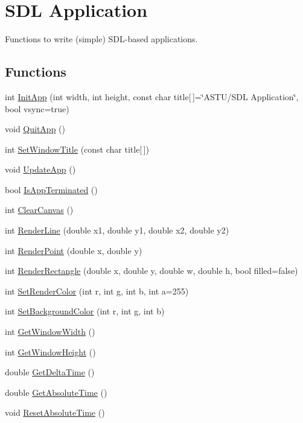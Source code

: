 \hypertarget{group__sdl__group}{}\section{S\+DL Application}
\label{group__sdl__group}


Functions to write (simple) S\+D\+L-\/based applications.  


\subsection*{Functions}
\begin{DoxyCompactItemize}
\item 
int \hyperlink{group__sdl__group_ga8f43e7993cf196bb0af33a60bc93aa75}{Init\+App} (int width, int height, const char title\mbox{[}$\,$\mbox{]}=\char`\"{}A\+S\+TU/S\+DL Application\char`\"{}, bool vsync=true)
\item 
void \hyperlink{group__sdl__group_gaf4cba1685a7c46bccc7bbdf863114cee}{Quit\+App} ()
\item 
int \hyperlink{group__sdl__group_ga6dfd8bbc85eeeee6922576be9ae65e29}{Set\+Window\+Title} (const char title\mbox{[}$\,$\mbox{]})
\item 
void \hyperlink{group__sdl__group_ga9bf9bfe01e7d336c3a3b13cc923ff850}{Update\+App} ()
\item 
bool \hyperlink{group__sdl__group_ga6d29aa641d22a0299da4710022c8c96b}{Is\+App\+Terminated} ()
\item 
int \hyperlink{group__sdl__group_ga4cc0ada571b47d2b809d441fa6766b52}{Clear\+Canvas} ()
\item 
int \hyperlink{group__sdl__group_gade420aec0a7492d5ac5f320b1ff4a814}{Render\+Line} (double x1, double y1, double x2, double y2)
\item 
int \hyperlink{group__sdl__group_gadd510400a2614b9b8fd8afbe368fc795}{Render\+Point} (double x, double y)
\item 
int \hyperlink{group__sdl__group_gaa5b815a9fcac2b1be46a5957bdbfd13f}{Render\+Rectangle} (double x, double y, double w, double h, bool filled=false)
\item 
int \hyperlink{group__sdl__group_gab01fa8f79d94269a5b9a1cb7d2e51843}{Set\+Render\+Color} (int r, int g, int b, int a=255)
\item 
int \hyperlink{group__sdl__group_ga540012b7df5eddd0b109543deaa66a22}{Set\+Background\+Color} (int r, int g, int b)
\item 
int \hyperlink{group__sdl__group_gaa938d3f784d26ccd4ed8c2d83bbc6ab4}{Get\+Window\+Width} ()
\item 
int \hyperlink{group__sdl__group_gac27ddd893a70056c55278b33d7bd2c62}{Get\+Window\+Height} ()
\item 
double \hyperlink{group__sdl__group_gaf9e3349b29171ad58521f5a7a6238fca}{Get\+Delta\+Time} ()
\item 
double \hyperlink{group__sdl__group_ga9b9387d774c6bc63e5e3c6c91296dedb}{Get\+Absolute\+Time} ()
\item 
void \hyperlink{group__sdl__group_ga5b39467f3664fad21ce3c0f14c4506ff}{Reset\+Absolute\+Time} ()
\end{DoxyCompactItemize}


